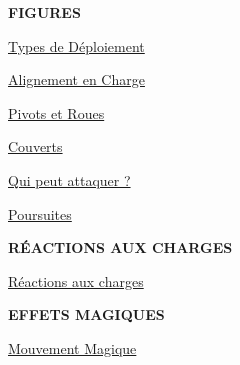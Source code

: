 
\setlength\columnseprule{0.5pt}
\hypertarget{toc}{\tableofcontents}
\thispagestyle{empty}
\setlength\columnseprule{0pt}

\newpage

\thispagestyle{empty}
\begin{center}\Hugefontsize{}\end{center}
\vspace*{10pt}

\begin{framed}
\vspace*{-10pt}
\setlength\columnseprule{0.5pt}
\begin{multicols}{3}\raggedcolumns
\begin{center}\textbf{FIGURES}\end{center}

\vspace*{5pt}
{\setlength\parskip{0pt}
\hyperlink{deploymenttypefigure}{Types de Déploiement}\hfill\pageref{figure/deployment}

\hyperlink{chargealignmentfigure}{Alignement en Charge}\hfill\pageref{figure/chargealignment}

\hyperlink{pivotsandwheelsfigure}{Pivots et Roues}\hfill\pageref{figure/wheels}

\hyperlink{coverfigures}{Couverts}\hfill\pageref{figure/soft_cover}

\hyperlink{whocanstrikefigure}{Qui peut attaquer ?}\hfill\pageref{figure/empty_gaps}

\hyperlink{pursuitsfigure}{Poursuites}\hfill\pageref{figure/pursuit}

\hyperlink{frontrankfigure}{\frontrank{}}\hfill\pageref{figure/front_rank}

\hyperlink{skirmishersfigure}{\skirmishers{}}\hfill\pageref{figure/skirmishers}}

\vspace*{5pt}
\begin{center}\textbf{RÉACTIONS AUX CHARGES}\end{center}

\vspace*{5pt}
{\setlength\parskip{0pt}
\hyperlink{chargereaction}{Réactions aux charges}\hfill\pageref{chargereaction}}

\vspace*{5pt}
\begin{center}\textbf{EFFETS MAGIQUES}\end{center}

\vspace*{5pt}
{\setlength\parskip{0pt}
\hyperlink{magicalmove}{Mouvement Magique}\hfill\pageref{magicalmove}

}
\end{multicols}
\end{framed}
